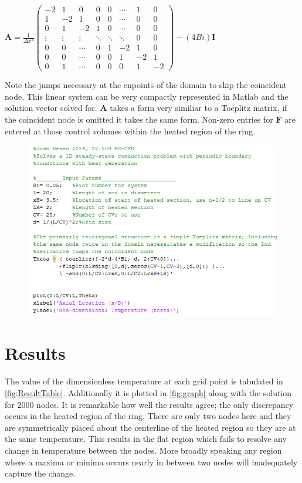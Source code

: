 \documentclass[letterpaper]{article}
\begin{document}
$\mathbf{A} = \frac{1}{\Delta x^2}
 \begin{pmatrix}
  -2 & 1 & 0 & 0 & 0 & \cdots & 1 & 0 \\
  1 & -2 & 1 & 0 & 0 & \cdots & 0 & 0 \\
  0 & 1 & -2 & 1 & 0 & \cdots & 0 & 0 \\
  \vdots  & \vdots & \vdots & \ddots & \ddots & \ddots & 0 & 0\\
  0 & 0 & \cdots & 0 & 1 & -2 & 1 & 0\\
  0 & 0 & \cdots & 0 & 0 & 1 & -2 & 1\\
  0 & 1 & \cdots & 0 & 0 & 0 & 1 & -2
 \end{pmatrix}
 -(4Bi)\mathbf{I}$
 
 Note the jumps necessary at the enpoints of the domain to skip the coincident node. This linear system can be very compactly represented in Matlab and the solution vector solved for. $\mathbf{A}$ takes a form very similiar to a Toeplitz matrix, if the coincident node is omitted it takes the same form. Non-zero entries for $\mathbf{F}$ are entered at those control volumes within the heated region of the ring.
 
\begin{figure}
\centerline{\includegraphics[width=1.2\textwidth]{PeriodicRingCode.PNG}}
\end{figure}

\section{Results}
The value of the dimensionless temperature at each grid point is tabulated in \ref{fig:ResultTable}. Additionally it is plotted in \ref{fig:graph} along with the solution for 2000 nodes. It is remarkable how well the results agree; the only discrepancy occurs in the heated region of the ring. There are only two nodes here and they are symmetrically placed about the centerline of the heated region so they are at the same temperature. This results in the flat region which fails to resolve any change in temperature between the nodes. More broadly speaking any region where a maxima or minima occurs nearly in between two nodes will inadequately capture the change.
\end{document}

